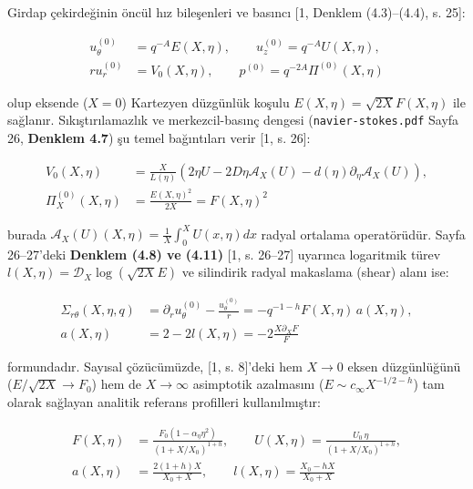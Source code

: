 \documentclass[12pt,a4paper]{article}
\begin{document}
Girdap çekirdeğinin öncül hız bileşenleri ve basıncı [1, Denklem (4.3)--(4.4), s. 25]:

\begin{equation}
\begin{split}
u_\theta^{(0)} &= q^{-A} E(X, \eta), \qquad u_z^{(0)} = q^{-A} U(X, \eta), \\
r u_r^{(0)} &= V_0(X, \eta), \qquad p^{(0)} = q^{-2A} \Pi^{(0)}(X, \eta)
\end{split}
\end{equation}

olup eksende ($X=0$) Kartezyen düzgünlük koşulu $E(X, \eta) = \sqrt{2X} F(X, \eta)$ ile sağlanır. Sıkıştırılamazlık ve merkezcil-basınç dengesi (\texttt{navier-stokes.pdf} Sayfa 26, \textbf{Denklem 4.7}) şu temel bağıntıları verir [1, s. 26]:

\begin{equation}
\begin{split}
V_0(X, \eta) &= \frac{X}{L(\eta)} \left( 2\eta U - 2D\eta \mathcal{A}_X(U) - d(\eta) \partial_\eta \mathcal{A}_X(U) \right), \\
\Pi_X^{(0)}(X, \eta) &= \frac{E(X, \eta)^2}{2X} = F(X, \eta)^2
\end{split}
\end{equation}

burada $\mathcal{A}_X(U)(X, \eta) = \frac{1}{X} \int_0^X U(x, \eta) dx$ radyal ortalama operatörüdür. Sayfa 26--27'deki \textbf{Denklem (4.8) ve (4.11)} [1, s. 26--27] uyarınca logaritmik türev $l(X, \eta) = \mathcal{D}_X \log(\sqrt{2X} E)$ ve silindirik radyal makaslama (shear) alanı ise:

\begin{equation}
\begin{split}
\Sigma_{r\theta}(X, \eta, q) &= \partial_r u_\theta^{(0)} - \frac{u_\theta^{(0)}}{r} = -q^{-1-h} F(X, \eta) \, a(X, \eta), \\
a(X, \eta) &= 2 - 2l(X, \eta) = -2 \frac{X \partial_X F}{F}
\end{split}
\end{equation}

formundadır. Sayısal çözücümüzde, [1, s. 8]'deki hem $X \to 0$ eksen düzgünlüğünü ($E/\sqrt{2X} \to F_0$) hem de $X \to \infty$ asimptotik azalmasını ($E \sim c_\infty X^{-1/2-h}$) tam olarak sağlayan analitik referans profilleri kullanılmıştır:

\begin{equation}
\begin{split}
F(X, \eta) &= \frac{F_0 (1 - \alpha_\eta \eta^2)}{(1 + X / X_0)^{1 + h}}, \qquad U(X, \eta) = \frac{U_0 \, \eta}{(1 + X / X_0)^{1 + h}}, \\
a(X, \eta) &= \frac{2(1+h)X}{X_0 + X}, \qquad l(X, \eta) = \frac{X_0 - h X}{X_0 + X}
\end{split}
\end{equation}
\end{document}
